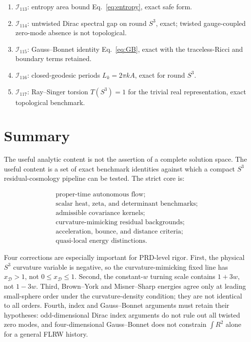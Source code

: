 \documentclass[
  aps,
  prd,
  reprint,
  superscriptaddress,
  nofootinbib,
  floatfix,
  longbibliography
]{revtex4-2}
\newcommand{\D}{\mathcal D}
\newcommand{\Inv}{\mathcal I}
\begin{document}
\begin{enumerate}
\item \(\Inv_{113}\): entropy area bound Eq.~\eqref{eq:entropy}, exact safe form.

\item \(\Inv_{114}\): untwisted Dirac spectral gap on round \(S^3\), exact; twisted
gauge-coupled zero-mode absence is not topological.

\item \(\Inv_{115}\): Gauss--Bonnet identity Eq.~\eqref{eq:GB}, exact with the
traceless-Ricci and boundary terms retained.

\item \(\Inv_{116}\): closed-geodesic periods \(L_k=2\pi kA\), exact for round
\(S^3\).

\item \(\Inv_{117}\): Ray--Singer torsion \(T(S^3)=1\) for the trivial real
representation, exact topological benchmark.

\end{enumerate}

\section{Summary}
\label{sec:summary}

The useful analytic content is not the assertion of a complete solution space.
The useful content is a set of exact benchmark identities against which a compact
\(S^3\) residual-cosmology pipeline can be tested.  The strict core is:

\begin{equation}
\begin{gathered}
\text{proper-time autonomous flow};\\
\text{scalar heat, zeta, and determinant benchmarks};\\
\text{admissible covariance kernels};\\
\text{curvature-mimicking residual backgrounds};\\
\text{acceleration, bounce, and distance criteria};\\
\text{quasi-local energy distinctions}.
\end{gathered}
\end{equation}

Four corrections are especially important for PRD-level rigor.  First, the
physical \(S^3\) curvature variable is negative, so the curvature-mimicking fixed
line has \(x_\D>1\), not \(0\le x_\D\le1\).  Second, the constant-\(w\) turning
scale contains \(1+3w\), not \(1-3w\).  Third, Brown--York and Misner--Sharp
energies agree only at leading small-sphere order under the curvature-density
condition; they are not identical to all orders.  Fourth, index and
Gauss--Bonnet arguments must retain their hypotheses: odd-dimensional Dirac
index arguments do not rule out all twisted zero modes, and four-dimensional
Gauss--Bonnet does not constrain \(\int R^2\) alone for a general FLRW history.
\end{document}
